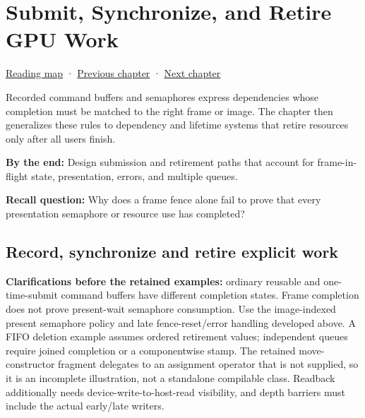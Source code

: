 \chapter{Submit, Synchronize, and Retire GPU Work}\label{01-foundations-i-ch014-submit-synchronize-and-retire-gpu-work}\hypertarget{01-foundations-i-ch014}{}\label{stagechapter:01-foundations-i-ch014}

\hypertarget{01-foundations-i-ch014-submit-synchronize-and-retire-gpu-work}{}

\hyperref[volume-reading-map]{Reading map} · \hyperref[01-foundations-i-ch013-open-vulkan-devices-and-describe-resources]{Previous chapter} · \hyperref[01-foundations-i-ch015-execute-and-measure-a-metal-frame]{Next chapter}

Recorded command buffers and semaphores express dependencies whose completion must be matched to the right frame or image. The chapter then generalizes these rules to dependency and lifetime systems that retire resources only after all users finish.

\textbf{By the end:} Design submission and retirement paths that account for frame-in-flight state, presentation, errors, and multiple queues.

\textbf{Recall question:} Why does a frame fence alone fail to prove that every presentation semaphore or resource use has completed?

\section{Record, synchronize and retire explicit work}\label{01-foundations-i-ch014-record-synchronize-and-retire-explicit-work}

\hypertarget{01-foundations-i-ch014-record-synchronize-and-retire-explicit-work}{}

\textbf{Clarifications before the retained examples:} ordinary reusable and one-time-submit command buffers have different completion states. Frame completion does not prove present-wait semaphore consumption. Use the image-indexed present semaphore policy and late fence-reset/error handling developed above. A FIFO deletion example assumes ordered retirement values; independent queues require joined completion or a componentwise stamp. The retained  move-constructor fragment delegates to an assignment operator that is not supplied, so it is an incomplete illustration, not a standalone compilable class. Readback additionally needs device-write-to-host-read visibility, and depth barriers must include the actual early/late writers.

